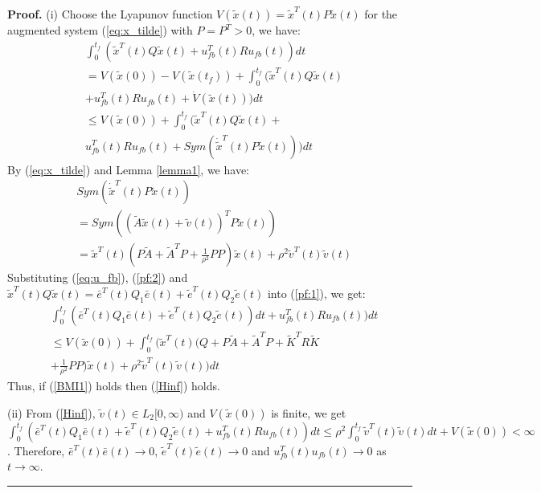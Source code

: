 \documentclass[journal,12pt,onecolumn,draftclsnofoot,]{IEEEtran}
\newenvironment{proof}[1][Proof]{\noindent\textbf{#1.} }{\ \rule{0.5em}{0.5em}}
\begin{document}
\begin{proof}
    (i) Choose the Lyapunov function $V(\tilde{x}(t))=\tilde{x}^T(t)P\tilde{x}(t)$ for the augmented system (\ref{eq:x_tilde}) with $P=P^T>0$, we have:
    \begin{equation} \label{pf:1}
        \begin{split}
            & \int_{0}^{t_f}(\tilde{x}^T(t)Q\tilde{x}(t) + u_{fb}^T(t)Ru_{fb}(t))dt \\
            & = V(\tilde{x}(0)) - V(\tilde{x}(t_f)) + \int_{0}^{t_f}(\tilde{x}^T(t)Q\tilde{x}(t) \\
            & + u_{fb}^T(t)Ru_{fb}(t) + \dot{V}(\tilde{x}(t)))dt \\
            & \leq V(\tilde{x}(0)) + \int_{0}^{t_f}(\tilde{x}^T(t)Q\tilde{x}(t) + \\
            & u_{fb}^T(t)Ru_{fb}(t) + Sym(\dot{\tilde{x}}^T(t)P\tilde{x}(t)))dt
        \end{split}
    \end{equation}
    By (\ref{eq:x_tilde}) and Lemma \ref{lemma1}, we have:
    \begin{equation} \label{pf:2}
        \begin{split}
            & Sym(\dot{\tilde{x}}^T(t)P\tilde{x}(t)) \\
            & = Sym((\tilde{A}\tilde{x}(t)+\tilde{v}(t))^TP\tilde{x}(t)) \\
            & = \tilde{x}^T(t)(P\tilde{A} + \tilde{A}^T P + \frac{1}{\rho^2}PP)\tilde{x}(t) + \rho^2\tilde{v}^T(t)\tilde{v}(t)
        \end{split}
    \end{equation}
    Substituting (\ref{eq:u_fb}), (\ref{pf:2}) and $\tilde{x}^T(t)Q\tilde{x}(t)=\bar{e}^T(t)Q_1\bar{e}(t)+\tilde{e}^T(t)Q_2\tilde{e}(t)$ into (\ref{pf:1}), we get:
    \begin{equation*} \label{pf:3}
        \begin{split}
            & \int_{0}^{t_f}(\bar{e}^T(t)Q_1\bar{e}(t)+\tilde{e}^T(t)Q_2\tilde{e}(t))dt + u_{fb}^T(t)Ru_{fb}(t))dt \\
            & \leq V(\tilde{x}(0)) + \int_{0}^{t_f}(\tilde{x}^T(t)(Q + P\tilde{A} + \tilde{A}^T P +\tilde{K}^TR\tilde{K}\\
            & + \frac{1}{\rho^2}PP)\tilde{x}(t) + \rho^2\tilde{v}^T(t)\tilde{v}(t))dt
        \end{split}
    \end{equation*}
    Thus, if (\ref{BMI1}) holds then (\ref{Hinf}) holds.

    (ii) From (\ref{Hinf}), $\tilde{v}(t)\in L_2[0, \infty)$ and $V(\tilde{x}(0))$ is finite, we get $\int_{0}^{t_f}(\bar{e}^T(t)Q_1\bar{e}(t) + \tilde{e}^T(t)Q_2\tilde{e}(t) + u_{fb}^T(t)Ru_{fb}(t))dt 
    \leq \rho^2 \int_{0}^{t_f}\tilde{v}^T(t)\tilde{v}(t)dt + V(\tilde{x}(0)) 
    < \infty$. Therefore, $\bar{e}^T(t)\bar{e}(t)\rightarrow 0$, $\tilde{e}^T(t)\tilde{e}(t)\rightarrow 0$ and $u_{fb}^T(t)u_{fb}(t)\rightarrow 0$ as $t\rightarrow \infty$.
\end{proof}
\end{document}
